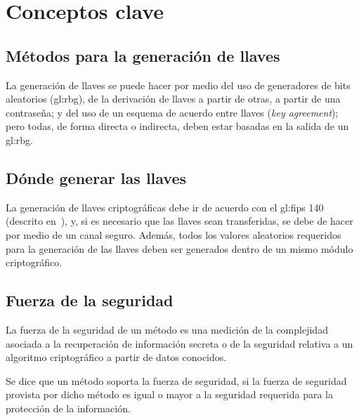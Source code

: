%
%



\section{Conceptos clave}

\subsection{Métodos para la generación de llaves}
La generación de llaves se puede hacer por medio del uso de generadores de
bits aleatorios (\gls{gl:rbg}), de la derivación de llaves a partir de otras,
a partir de una contraseña; y del uso de un esquema de acuerdo entre llaves
(\textit{key agreement}); pero todas, de forma directa o indirecta, deben estar
basadas en la salida de un \gls{gl:rbg}.

\subsection{Dónde generar las llaves}
La generación de llaves criptográficas debe ir de acuerdo con el \gls{gl:fips}
140 (descrito en~\cite{nist_modulos_criptograficos}), y, si es necesario que
las llaves sean transferidas, se debe de hacer por medio de un canal seguro.
Además, todos los valores aleatorios requeridos para la generación de las
llaves deben ser generados dentro de un mismo módulo criptográfico.

\subsection{Fuerza de la seguridad}
La fuerza de la seguridad de un método es una medición de la complejidad
asociada a la recuperación de información secreta o de la seguridad relativa
a un algoritmo criptográfico a partir de datos conocidos.

Se dice que un método soporta la fuerza de seguridad, si la fuerza de
seguridad provista por dicho método es igual o mayor a la seguridad
requerida para la protección de la información.


